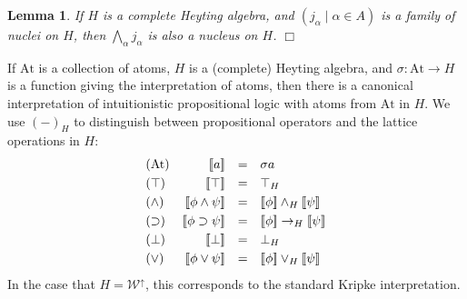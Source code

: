 \documentclass{sn-jnl}
\newcommand{\At}{\text{At}}
\newcommand{\worlds}{\mathcal W}
\newcommand{\db}[1]{[\![#1]\!]}
\newtheorem{lemma}[theorem]{Lemma}
\newcommand{\fillBox}{\hfill$\Box$}
\begin{document}
\smallskip 

\begin{lemma}
    If $H$ is a complete Heyting algebra, and $(j_\alpha \mid \alpha\in A)$ is a family of nuclei on $H$, then $\bigwedge_\alpha j_\alpha$ is also a nucleus on $H$. \fillBox
\end{lemma}

\smallskip 

If $\At$ is a collection of atoms, $H$ is a (complete) Heyting algebra, and $\sigma : \At\to H$ is a function giving the interpretation of atoms, then there is a canonical interpretation of intuitionistic propositional logic with atoms from $\At$ in $H$. We use $(-)_H$ to distinguish between propositional operators and the lattice operations in $H$: 
\[
\begin{array}{lr@{\quad}c@{\quad}l}
(\mbox{At}) & \db{a} & = & \sigma a \\ [1mm]
(\top)      & \db{\top} & = & \top_H \\ [1mm]
(\wedge)    & \db{\phi\wedge\psi} & = &
              \db{\phi}\wedge_H\db{\psi} \\ [1mm]
(\supset)   & \db{\phi\supset\psi} & = & 
              \db{\phi}\to_H\db{\psi} \\ [1mm]
(\bot)      & \db{\bot} & = & \bot_H \\ [1mm]
(\vee)      & \db{\phi\vee\psi} & = & 
              \db{\phi}\vee_H\db{\psi}
\end{array}
\]
In the case that $H=\worlds^\uparrow$, this corresponds to the standard Kripke interpretation. 
\end{document}
